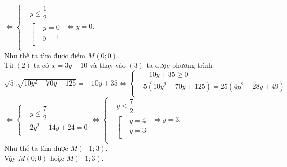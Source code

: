 \begin{ex}
{			$\Leftrightarrow \left\{ \begin{aligned}
				& y\le \dfrac{1}{2} \\ 
				& \left[ \begin{aligned}
					& y=0 \\ 
					& y=1 \\ 
				\end{aligned} \right. \\ 
			\end{aligned} \right.\Leftrightarrow y=0$.\\
			Như thế ta tìm được điểm $M\left( 0;0 \right)$.\\
			Từ $\left( 2 \right)$ ta có $ x=3y-10$ và thay vào $\left( 3 \right)$ ta được phương trình\\
			$\sqrt{5}.\sqrt{10y^2-70y+125}=-10y+35\Leftrightarrow \left\{ \begin{aligned}
				& -10y+35\ge 0 \\ 
				& 5\left( 10y^2-70y+125 \right)=25\left( 4y^2-28y+49 \right) \\ 
			\end{aligned} \right.$\\
			$\Leftrightarrow \left\{ \begin{aligned}
				& y\le \dfrac{7}{2} \\ 
				& 2y^2-14y+24=0 \\ 
			\end{aligned} \right.\Leftrightarrow \left\{ \begin{aligned}
				& y\le \dfrac{7}{2} \\ 
				& \left[ \begin{aligned}
					& y=4 \\ 
					& y=3 \\ 
				\end{aligned} \right. \\ 
			\end{aligned} \right.\Leftrightarrow y=3$.\\
			Như thế ta tìm được $M\left( -1;3 \right)$.\\
			Vậy $M\left( 0;0 \right)$ hoặc $M\left( -1;3 \right)$.}
	\end{ex}
